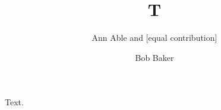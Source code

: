 \documentclass{llncs}
\begin{document}
\title{T}
\author{Ann Able and [equal contribution] \and Bob Baker}
\maketitle
Text.
\end{document}
